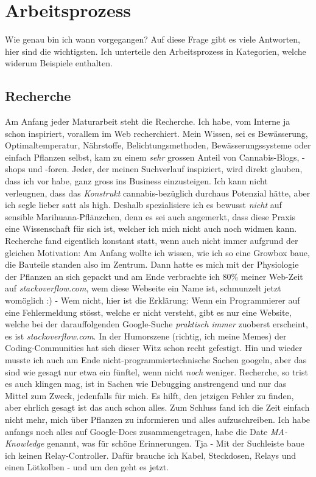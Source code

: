 \documentclass[12pt,titlepage,a4paper]{article}
\begin{document}
\section{Arbeitsprozess}
Wie genau bin ich wann vorgegangen? Auf diese Frage gibt es viele Antworten, hier sind die wichtigsten. Ich unterteile den Arbeitsprozess in Kategorien, welche widerum Beispiele enthalten.

\subsection{Recherche}
Am Anfang jeder Maturarbeit steht die Recherche. Ich habe, vom Interne ja schon inspiriert, vorallem im Web recherchiert. Mein Wissen, sei es Bewässerung, Optimaltemperatur, Nährstoffe, Belichtungsmethoden, Bewässerungssysteme oder einfach Pflanzen selbst, kam zu einem \textit{sehr} grossen Anteil von Cannabis-Blogs, -shops und -foren. Jeder, der meinen Suchverlauf inspiziert, wird direkt glauben, dass ich vor habe, ganz gross ins Business einzusteigen. Ich kann nicht verleugnen, dass das \textit{Konstrukt} cannabis-bezüglich durchaus Potenzial hätte, aber ich segle lieber satt als high. Deshalb spezialisiere ich es bewusst \textit{nicht} auf sensible Marihuana-Pflänzchen, denn es sei auch angemerkt, dass diese Praxis eine Wissenschaft für sich ist, welcher ich mich nicht auch noch widmen kann. \\ Recherche fand eigentlich konstant statt, wenn auch nicht immer aufgrund der gleichen Motivation: Am Anfang wollte ich wissen, wie ich so eine Growbox baue, die Bauteile standen also im Zentrum. Dann hatte es mich mit der Physiologie der Pflanzen an sich gepackt und am Ende verbrachte ich 80\% meiner Web-Zeit auf \textit{stackoverflow.com}, wem diese Webseite ein Name ist, schmunzelt jetzt womöglich :) - Wem nicht, hier ist die Erklärung: Wenn ein Programmierer auf eine Fehlermeldung stösst, welche er nicht versteht, gibt es nur eine Website, welche bei der darauffolgenden Google-Suche \textit{praktisch immer} zuoberst erscheint, es ist \textit{stackoverflow.com}. In der Humorszene (richtig, ich meine Memes) der Coding-Communities hat sich dieser Witz schon recht gefestigt. Hin und wieder musste ich auch am Ende nicht-programmiertechnische Sachen googeln, aber das sind wie gesagt nur etwa ein fünftel, wenn nicht \textit{noch} weniger. Recherche, so trist es auch klingen mag, ist in Sachen wie Debugging anstrengend und nur das Mittel zum Zweck, jedenfalls für mich. Es hilft, den jetzigen Fehler zu finden, aber ehrlich gesagt ist das auch schon alles. Zum Schluss fand ich die Zeit einfach nicht mehr, mich über Pflanzen zu informieren und alles aufzuschreiben. Ich habe anfangs noch alles auf Google-Docs zusammengetragen, habe die Date \textit{MA-Knowledge} genannt, was für schöne Erinnerungen. Tja - Mit der Suchleiste baue ich keinen Relay-Controller. Dafür brauche ich Kabel, Steckdosen, Relays und einen Lötkolben - und um den geht es jetzt.
\end{document}

